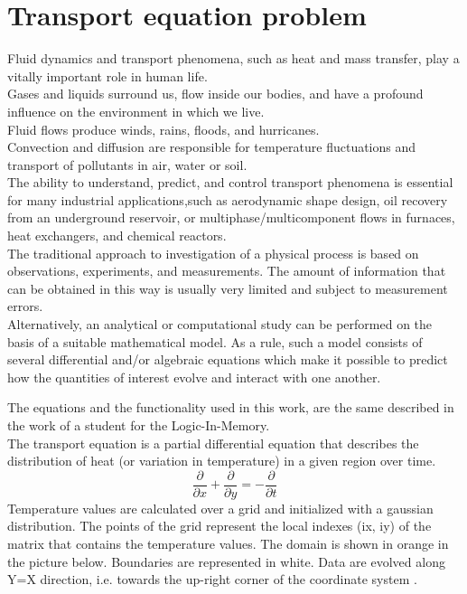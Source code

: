 \chapter{Transport equation problem}
Fluid dynamics and transport phenomena, such as heat and mass transfer, play a vitally important role in human life.\\
Gases and liquids surround us, flow inside our bodies, and have a profound influence on the environment in which we live.\\
 Fluid flows produce winds, rains, floods, and hurricanes.\\ Convection and diffusion are responsible for temperature fluctuations and transport of pollutants in air, water or soil.\\
The ability to understand, predict, and control transport phenomena is essential for many industrial applications,such as aerodynamic shape design, oil recovery from an underground reservoir, or multiphase/multicomponent flows in furnaces, heat exchangers, and chemical reactors.\\
The traditional approach to investigation of a physical process is based on observations, experiments, and measurements. The amount of information that can be obtained in this way is usually very limited and subject to measurement errors.\\
Alternatively, an analytical or computational study can be performed on the basis of a suitable mathematical model. As a rule, such a model consists of several differential and/or algebraic equations which make it possible to predict how the quantities of interest evolve and interact with one another. \cite{tep1}
	\\
\bigskip

The equations and the functionality used in this work, are the same described in the work of a student for the Logic-In-Memory. \\
The transport equation is a partial differential equation that describes the distribution of heat (or variation in temperature) in a given region over time.
\begin{equation}
	\dfrac{\partial}{\partial x} + \dfrac{\partial}{\partial y} = -\dfrac{\partial}{\partial t}
\end{equation}
Temperature values are calculated over a grid and initialized with a gaussian distribution. The points of the grid represent the local indexes (ix, iy) of the matrix that contains the temperature values. The domain is shown in orange in the picture below. Boundaries are represented in white. Data are evolved along Y=X direction, i.e. towards the up-right corner of the coordinate system \cite{lim}.

